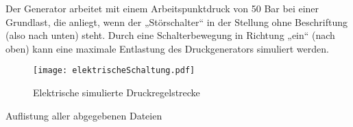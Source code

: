 \documentclass[11pt, a4paper,parskip=half]{article}
\begin{document}
Der Generator arbeitet mit einem Arbeitspunktdruck von 50 Bar bei einer Grundlast, die anliegt, wenn der „Störschalter“ in der Stellung ohne Beschriftung (also nach unten) steht. Durch eine Schalterbewegung in Richtung „ein“ (nach oben) kann eine maximale Entlastung des Druckgenerators simuliert werden.


\begin{figure}[htbp]
	\begin{center}
		\texttt{[image: elektrischeSchaltung.pdf]} 
		\caption{Elektrische simulierte Druckregelstrecke}
     \label{RegelObj}
	\end{center} 
\end{figure}


\newpage
\begin{huge}
Auflistung aller abgegebenen Dateien\\

\end{huge}
\end{document}
